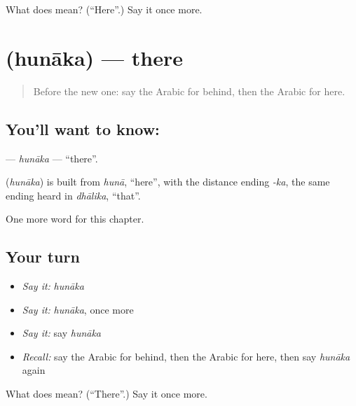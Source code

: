 \begin{tcolorbox}[breakable,colback=teal!4,colframe=teal!35!black,title={Before you move on}]
What does  mean? (\textquotedblleft{}Here\textquotedblright{}.) Say it once more.
\end{tcolorbox}
\section[\texorpdfstring{\ar{هناك} (hunāka)}{هناك (hunāka)}]{ (hunāka) — there}

\label{lesson:AR-C90-hunaka}



\begin{quote}
Before the new one: say the Arabic for behind, then the Arabic for here.
\end{quote}

\subsection*{You'll want to know: }
\textbf{} — \emph{hunāka} — \textquotedblleft{}there\textquotedblright{}.

\begin{cousinweb}
\textbf{} (\emph{hunāka}) is built from \emph{hunā}, \textquotedblleft{}here\textquotedblright{}, with the distance ending \emph{-ka}, the same ending heard in \emph{dhālika}, \textquotedblleft{}that\textquotedblright{}.
\end{cousinweb}

\begin{grammarlens}[title={What you've built}]
One more word for this chapter.
\end{grammarlens}

\subsection*{Your turn}
\begin{itemize}
\raggedright
  \item \emph{Say it:} \emph{hunāka}
  \item \emph{Say it:} \emph{hunāka}, once more
  \item \emph{Say it:} say \emph{hunāka}
  \item \emph{Recall:} say the Arabic for behind, then the Arabic for here, then say \emph{hunāka} again
\end{itemize}

\begin{tcolorbox}[breakable,colback=teal!4,colframe=teal!35!black,title={Before you move on}]
What does  mean? (\textquotedblleft{}There\textquotedblright{}.) Say it once more.
\end{tcolorbox}
